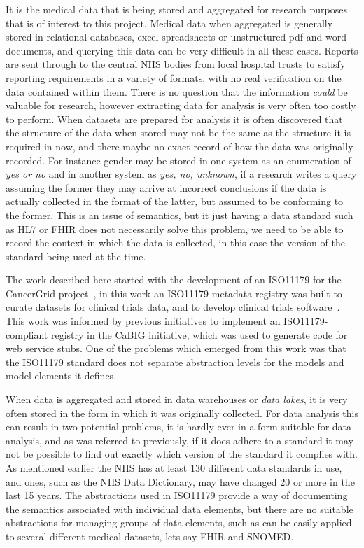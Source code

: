 \documentclass{llncs}
\begin{document}
	It is the medical data that is being stored and aggregated for research purposes that is of interest to this project. Medical data when aggregated is generally stored in relational databases, excel spreadsheets or unstructured pdf and word documents, and querying this data can be very difficult in all these cases. Reports are sent through to the central NHS bodies from local hospital trusts to satisfy reporting requirements in a variety of formats, with no real verification on the data contained within them. There is no question that the information \emph{could} be valuable for research, however extracting data for analysis is very often too costly to perform.  When datasets are prepared for analysis it is often discovered that the structure of the data when stored may not be the same as the structure it is required in now, and there maybe no exact record of how the data was originally recorded. For instance gender may be stored in one system as an enumeration of \emph{yes or no} and in another system as \emph{yes, no, unknown}, if a research writes a query assuming the former they may arrive at incorrect conclusions if the data is actually collected in the format of the latter, but assumed to be conforming to the former. This is an issue of semantics, but it just having a data standard such as HL7 or FHIR does not necessarily solve this problem, we need to be able to record the context in which the data is collected, in this case the version of the standard being used at the time.
	
	The work described here started with the development of an ISO11179 for the CancerGrid project~\cite{davi14}, in this work an ISO11179 metadata registry was built to curate datasets for clinical trials data, and to develop clinical trials software~\cite{davi12}. This work was informed by previous initiatives to implement an ISO11179-compliant registry in the CaBIG initiative, which was used to generate code for web service stubs. One of the problems which emerged from this work was that the ISO11179 standard does not separate abstraction levels for the models and model elements it defines.
	
	When data is aggregated and stored in data warehouses or \emph{data lakes}, it is very often stored in the form in which it was originally collected. For data analysis this can result in two potential problems, it is hardly ever in a form suitable for data analysis, and as was referred to previously, if it does adhere to a standard it may not be possible to find out exactly which version of the standard it complies with. As mentioned earlier the NHS has at least 130 different data standards in use, and ones, such as the NHS Data Dictionary, may have changed 20 or more in the last 15 years. The abstractions used in ISO11179 provide a way of documenting the semantics associated with individual data elements, but there are no suitable abstractions for managing groups of data elements, such as can be easily applied to several different medical datasets, lets say FHIR and SNOMED.
	
\end{document}
